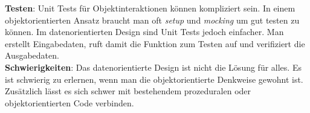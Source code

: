 \textbf{Testen}: Unit Tests für Objektinteraktionen können kompliziert sein. In einem objektorientierten Ansatz braucht man oft \textit{setup} und \textit{mocking} um gut testen zu können. Im datenorientierten Design sind Unit Tests jedoch einfacher. Man erstellt Eingabedaten, ruft damit die Funktion zum Testen auf und verifiziert die Ausgabedaten.\\
\textbf{Schwierigkeiten}: Das datenorientierte Design ist nicht die Lösung für alles. Es ist schwierig zu erlernen, wenn man die objektorientierte Denkweise gewohnt ist. Zusätzlich lässt es sich schwer mit bestehendem prozeduralen oder objektorientierten Code verbinden.